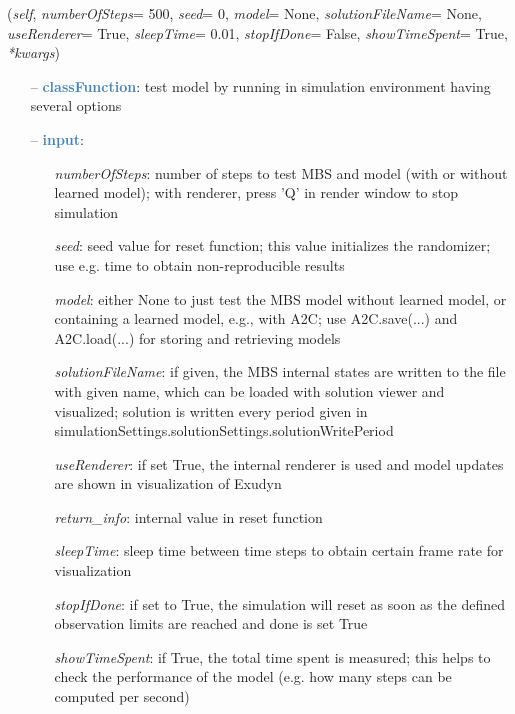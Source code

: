 \begin{itemize}[leftmargin=1.4cm]
\begin{flushleft}
({\it self}, {\it numberOfSteps}= 500, {\it seed}= 0, {\it model}= None, {\it solutionFileName}= None, {\it useRenderer}= True, {\it sleepTime}= 0.01, {\it stopIfDone}= False, {\it showTimeSpent}= True, {\it **kwargs})
\end{flushleft}
\setlength{\itemindent}{0.7cm}
\begin{itemize}[leftmargin=0.7cm]
\item[--]\textcolor{steelblue}{\bf classFunction}: test model by running in simulation environment having several options
\item[--]\textcolor{steelblue}{\bf input}: \vspace{-6pt}
\begin{itemize}[leftmargin=1.2cm]
\setlength{\itemindent}{-0.7cm}
\item[]{\it numberOfSteps}: number of steps to test MBS and model (with or without learned model); with renderer, press 'Q' in render window to stop simulation
\item[]{\it seed}: seed value for reset function; this value initializes the randomizer; use e.g. time to obtain non-reproducible results
\item[]{\it model}: either None to just test the MBS model without learned model, or containing a learned model, e.g., with A2C; use A2C.save(...) and A2C.load(...) for storing and retrieving models
\item[]{\it solutionFileName}: if given, the MBS internal states are written to the file with given name, which can be loaded with solution viewer and visualized; solution is written every period given in simulationSettings.solutionSettings.solutionWritePeriod
\item[]{\it useRenderer}: if set True, the internal renderer is used and model updates are shown in visualization of Exudyn
\item[]{\it return\_info}: internal value in reset function
\item[]{\it sleepTime}: sleep time between time steps to obtain certain frame rate for visualization
\item[]{\it stopIfDone}: if set to True, the simulation will reset as soon as the defined observation limits are reached and done is set True
\item[]{\it showTimeSpent}: if True, the total time spent is measured; this helps to check the performance of the model (e.g. how many steps can be computed per second)
\end{itemize}
\vspace{12pt}\end{itemize}

\end{itemize}
